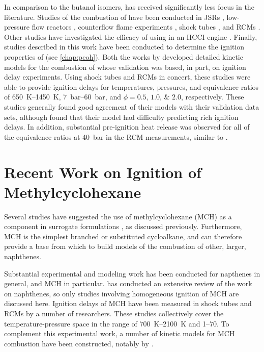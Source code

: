 \documentclass[../main.tex]{subfiles}
\begin{document}
In comparison to the butanol isomers, \iPeOH{} has received significantly
less focus in the literature. Studies of the combustion of \iPeOH{}
have been conducted in JSRs \cite{Dayma2011,Togbe2011,Sarathy2013}, low-pressure flow
reactors \cite{Welz2012}, counterflow flame experiments \cite{Sarathy2013},
shock tubes \cite{Sarathy2013, Tsujimura2012, Tang2013}, and RCMs
\cite{Sarathy2013, Tsujimura2012}. Other studies have investigated
the efficacy of using \iPeOH{} in an HCCI engine \cite{Tsujimura2011,
Yacoub1998, Yang2010}. Finally, studies described in this work have
been conducted to determine the ignition properties of \iPeOH{} (see \cref{chap:peoh}).
Both the works by \textcite{Tsujimura2012, Sarathy2013} developed
detailed kinetic models for the combustion of \iPeOH{} whose validation
was based, in part, on ignition delay experiments. Using shock tubes and
RCMs in concert, these studies were able to provide ignition delays
for temperatures, pressures, and equivalence ratios of
\SIrange{650}{1450}{\kelvin}, \SIrange{7}{60}{\bar}, and $\phi =
\numlist{0.5;1.0;2.0}$, respectively. These studies generally found good
agreement of their models with their validation data sets, although
\textcite{Sarathy2013} found that their model had difficulty predicting
rich ignition delays. In addition, substantial pre-ignition heat release
was observed for all of the equivalence ratios at \SI{40}{\bar} in the
RCM measurements, similar to \tBuOH{}.

\section{Recent Work on Ignition of Methylcyclohexane}

Several studies have suggested the use of methylcyclohexane (MCH) as a
component in surrogate formulations \cite{Bieleveld2009,Naik2005}, as
discussed previously. Furthermore, MCH is the simplest branched or
substituted cycloalkane, and can therefore provide a base from which
to build models of the combustion of other, larger, naphthenes.

Substantial experimental and modeling work has been conducted for
napthenes in general, and MCH in particular. \textcite{Pitz2011} has
conducted an extensive review of the work on naphthenes, so only studies
involving homogeneous ignition of MCH are discussed here. Ignition delays of MCH
have been measured in shock tubes \cite{Rotavera2013, Vasu2009,
Vanderover2009, Hawthorn1966, Orme2006, Hong2011} and RCMs \cite{Tanaka2003,
Pitz2007, Mittal2009} by a number of researchers. These studies collectively
cover the temperature-pressure space in the range of \SIrange{700}{2100}{\kelvin}
and \SIrange{1}{70}{\atmosphere}. To complement this experimental work, a number
of kinetic models for MCH combustion have been constructed, notably by
\textcite{Orme2006, Pitz2007}.
\end{document}
